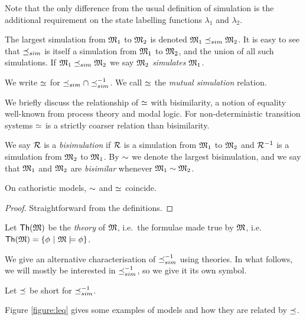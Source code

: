 \NI Note that the only difference from the usual definition of
simulation is the additional requirement on the state labelling
functions $\lambda_1$ and $\lambda_2$.

\begin{definition}
The largest simulation from $\frak{M}_1$ to $\frak{M}_2$ is denoted $\frak{M}_1
\preceq_{sim} \frak{M}_2$.  It is easy to see that $\preceq_{sim}$ is itself a
simulation from $\frak{M}_1$ to $\frak{M}_2$, and the union of all such
simulations.  If $\frak{M}_1 \preceq_{sim} \frak{M}_2$ we say $\frak{M}_2$
\emph{simulates} $\frak{M}_1$.

We write $\simeq$ for $\preceq_{sim} \cap \preceq_{sim}^{-1}$. We call $\simeq$ the
\emph{mutual simulation} relation.
\end{definition}

\NI We briefly discuss the relationship of $\simeq$ with
bisimilarity, a notion of equality well-known from process theory and
modal logic. For non-deterministic transition systems $\simeq$ is a
strictly coarser relation than bisimilarity.

\begin{definition}
We say $\mathcal{R}$ is a \emph{bisimulation} if $\mathcal{R}$ is a simulation from
$\frak{M}_1$ to $\frak{M}_2$ and $\mathcal{R}^{-1}$ is a simulation from $\frak{M}_2$ to
$\frak{M}_1$. By $\sim$ we denote the largest bisimulation, and we say
that $\frak{M}_1$ and $\frak{M}_2$ are \emph{bisimilar} whenever $\frak{M}_1
\sim \frak{M}_2$.
\end{definition}

\begin{lemma}
On cathoristic models, $\sim$ and $\simeq$ coincide.
\end{lemma}
\begin{proof}
Straightforward from the definitions.
\end{proof}

\begin{definition}
Let $\mathsf{Th}(\frak{M})$ be the \emph{theory} of $\frak{M}$, i.e.~the formulae
made true by $\frak{M}$, i.e.~$\mathsf{Th}(\frak{M}) = \{\phi\ |\ \frak{M} \models
\phi \}$.
\end{definition}

\NI We give an alternative characterisation of $\preceq_{sim}^{-1}$ using
theories. In what follows, we will mostly be interested in
$\preceq_{sim}^{-1}$, so we give it its own symbol.

\begin{definition}
Let $\preceq$  be short for $\preceq_{sim}^{-1}$. 
\end{definition}

\NI Figure \ref{figure:leq} gives some examples of models and how they
are related by $\preceq$.


